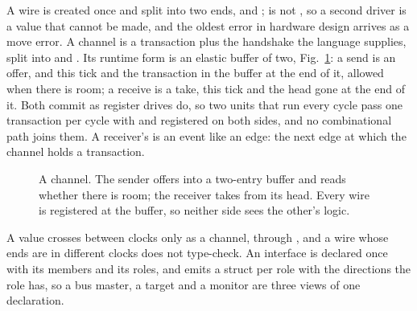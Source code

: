\documentclass[journal,9pt]{IEEEtran}
\begin{document}
A wire is created once and split into two ends,  and
;  is not , so a second driver is a
value that cannot be made, and the oldest error in hardware design
arrives as a move error. A channel is a transaction plus the
handshake the language supplies, split into  and .
Its runtime form is an elastic buffer of two, Fig.~\ref{fig:p-chan}:
a send is an offer,  and  this tick and the
transaction in the buffer at the end of it, allowed when there is
room; a receive is a take,  this tick and the head gone
at the end of it. Both commit as register drives do, so two units
that run every cycle pass one transaction per cycle with
 and  registered on both sides, and no
combinational path joins them. A receiver's  is an event
like an edge: the next edge at which the channel holds a transaction.

\begin{figure}[htbp]
\centering
{}
\caption{A channel. The sender offers into a two-entry buffer and reads
whether there is room; the receiver takes from its head. Every wire is
registered at the buffer, so neither side sees the other's logic.}
\label{fig:p-chan}
\end{figure}

A value crosses between clocks only as a channel, through
, and a wire whose ends are in different clocks does not
type-check. An
interface is declared once with its members and its roles, and
 emits a struct per role with the directions the
role has, so a bus master, a target and a monitor are three views of
one declaration.
\end{document}
